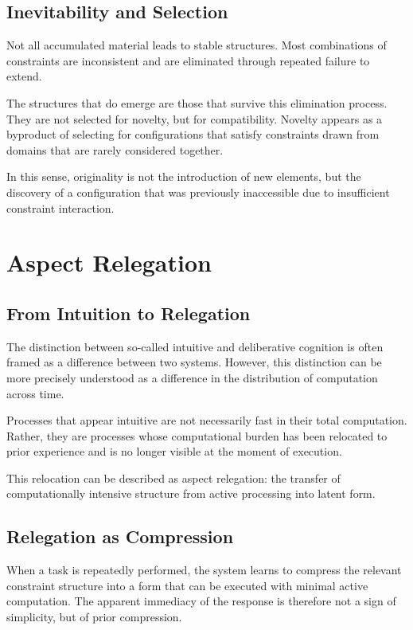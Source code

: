 \documentclass[11pt]{article}
\theoremstyle{plain}
\theoremstyle{definition}
\theoremstyle{remark}
\begin{document}
\subsection{Inevitability and Selection}

Not all accumulated material leads to stable structures. Most combinations
of constraints are inconsistent and are eliminated through repeated failure
to extend.

The structures that do emerge are those that survive this elimination
process. They are not selected for novelty, but for compatibility. Novelty
appears as a byproduct of selecting for configurations that satisfy constraints
drawn from domains that are rarely considered together.

In this sense, originality is not the introduction of new elements, but
the discovery of a configuration that was previously inaccessible due to
insufficient constraint interaction.

\section{Aspect Relegation}

\subsection{From Intuition to Relegation}

The distinction between so-called intuitive and deliberative cognition
is often framed as a difference between two systems. However, this
distinction can be more precisely understood as a difference in the
distribution of computation across time.

Processes that appear intuitive are not necessarily fast in their total
computation. Rather, they are processes whose computational burden has
been relocated to prior experience and is no longer visible at the moment
of execution.

This relocation can be described as aspect relegation: the transfer of
computationally intensive structure from active processing into latent
form.

\subsection{Relegation as Compression}

When a task is repeatedly performed, the system learns to compress the
relevant constraint structure into a form that can be executed with
minimal active computation. The apparent immediacy of the response is
therefore not a sign of simplicity, but of prior compression.
\end{document}
